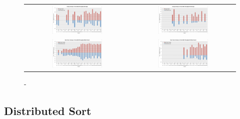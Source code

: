 \setlength\tabcolsep{0 pt}
\begin{figure}[tb]
\centering
\begin{tabular}{c  c}
\includegraphics[width=0.5\textwidth]{figs/energy_k80.pdf} &
\includegraphics[width=0.5\textwidth]{figs/energy_tp_k80.pdf} \\
%
\includegraphics[width=0.5\textwidth]{figs/max_power_k80.pdf} &
\includegraphics[width=0.5\textwidth]{figs/max_power_tp_k80.pdf} \\

\end{tabular}





\caption{ - }
\label{fig:objective_func}

\end{figure}
\subsection{Distributed Sort}

